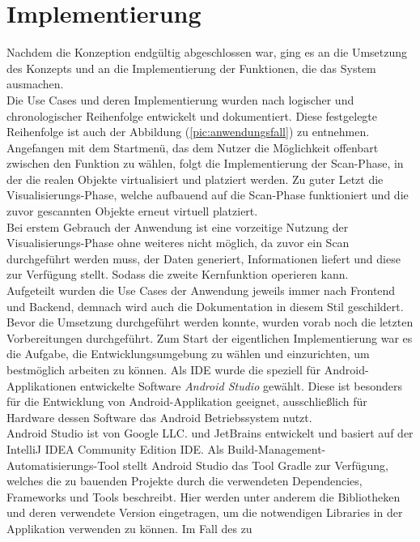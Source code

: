 \section{Implementierung}
\label{chap:implementierung}
Nachdem die Konzeption endgültig abgeschlossen war, ging es an die Umsetzung des Konzepts und an die Implementierung der Funktionen, die das System 
ausmachen. 
\\ 
Die Use Cases und deren Implementierung wurden nach logischer und chronologischer Reihenfolge entwickelt und dokumentiert. Diese festgelegte Reihenfolge 
ist auch der Abbildung (\ref{pic:anwendungsfall}) zu entnehmen. Angefangen mit dem Startmenü, das dem Nutzer die Möglichkeit offenbart zwischen den Funktion 
zu wählen, folgt die Implementierung der Scan-Phase, in der die realen Objekte virtualisiert und platziert werden. Zu guter Letzt die Visualisierungs-Phase, 
welche aufbauend auf die Scan-Phase funktioniert und die zuvor gescannten Objekte erneut virtuell platziert. 
\\ 
Bei erstem Gebrauch der Anwendung ist eine vorzeitige Nutzung der Visualisierungs-Phase ohne weiteres nicht möglich, da zuvor ein Scan durchgeführt 
werden muss, der Daten generiert, Informationen liefert und diese zur Verfügung stellt. Sodass die zweite Kernfunktion operieren kann.
\\ 
\linebreak 
Aufgeteilt wurden die Use Cases der Anwendung jeweils immer nach Frontend und Backend, demnach wird auch die Dokumentation in diesem Stil geschildert. 
\\ 
\linebreak
Bevor die Umsetzung durchgeführt werden konnte, wurden vorab noch die letzten Vorbereitungen durchgeführt.
Zum Start der eigentlichen Implementierung war es die Aufgabe, die Entwicklungsumgebung zu wählen und einzurichten, um bestmöglich arbeiten zu können. Als 
\ac{IDE} wurde die speziell für Android-Applikationen entwickelte Software \textit{Android Studio} gewählt. Diese ist besonders für die Entwicklung von 
Android-Applikation geeignet, ausschließlich für Hardware dessen Software das Android Betriebssystem nutzt. 
\\
Android Studio ist von Google LLC. und JetBrains entwickelt und basiert auf der IntelliJ IDEA Community Edition \acs{IDE}. Als 
Build-Management-Automatisierungs-Tool stellt Android Studio das Tool Gradle zur Verfügung, welches die zu bauenden Projekte durch die verwendeten 
Dependencies, Frameworks und Tools beschreibt. Hier werden unter 
anderem die Bibliotheken und deren verwendete Version eingetragen, um die notwendigen Libraries in der Applikation verwenden zu können. Im Fall des zu 
